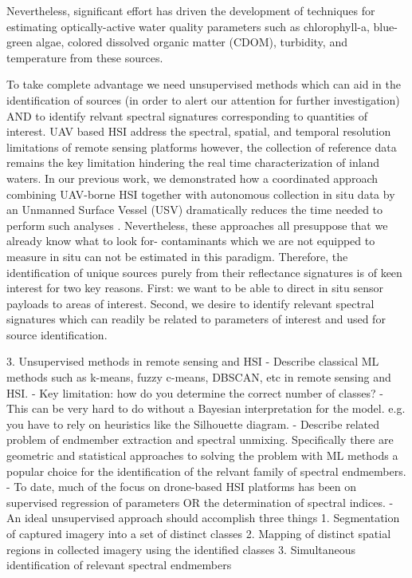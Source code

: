 \documentclass[remotesensing,article,submit,pdftex,moreauthors]{Definitions/mdpi}
\begin{document}
Nevertheless, significant effort has driven the development of techniques for estimating optically-active water quality parameters such as chlorophyll-a, blue-green algae, colored dissolved organic matter (CDOM), turbidity, and temperature from these sources. 

To take complete advantage we need unsupervised methods which can aid in the identification of sources (in order to alert our attention for further investigation) AND to identify relvant spectral signatures corresponding to quantities of interest. UAV based HSI address the spectral, spatial, and temporal resolution limitations of remote sensing platforms however, the collection of reference data remains the key limitation hindering the real time characterization of inland waters. In our previous work, we demonstrated how a coordinated approach combining UAV-borne HSI together with autonomous collection in situ data by an Unmanned Surface Vessel (USV) dramatically reduces the time needed to perform such analyses \cite{robot-team-1, robot-team-2}. Nevertheless, these approaches all presuppose that we already know what to look for- contaminants which we are not equipped to measure in situ can not be estimated in this paradigm. Therefore, the identification of unique sources purely from their reflectance signatures is of keen interest for two key reasons. First: we want to be able to direct in situ sensor payloads to areas of interest. Second, we desire to identify relevant spectral signatures which can readily be related to parameters of interest and used for source identification.



3. Unsupervised methods in remote sensing and HSI
- Describe classical ML methods such as k-means, fuzzy c-means, DBSCAN, etc in remote sensing and HSI. 
    - Key limitation: how do you determine the correct number of classes?
    - This can be very hard to do without a Bayesian interpretation for the model. e.g. you have to rely on heuristics like the Silhouette diagram.
- Describe related problem of endmember extraction and spectral unmixing. Specifically there are geometric and statistical approaches to solving the problem with ML methods a popular choice for the identification of the relvant family of spectral endmembers.
- To date, much of the focus on drone-based HSI platforms has been on supervised regression of parameters OR the determination of spectral indices.
- An ideal unsupervised approach should accomplish three things
    1. Segmentation of captured imagery into a set of distinct classes
    2. Mapping of distinct spatial regions in collected imagery using the identified classes
    3. Simultaneous identification of relevant spectral endmembers
\end{document}
